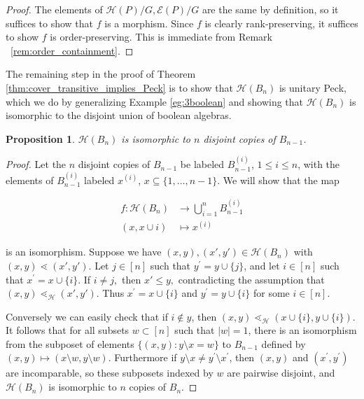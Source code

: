 \documentclass[10 pt]{amsart}
\theoremstyle{plain}
\newtheorem{prop}[thm]{Proposition}
\theoremstyle{definition}
\theoremstyle{remark}
\numberwithin{equation}{section}
\begin{document}
\begin{proof}
The elements of $\mathcal H(P)/G,\mathcal E(P)/G$ are the same by definition, so it suffices to show that $f$ is a morphism. Since $f$ is clearly rank-preserving, it suffices to show $f$ is order-preserving. This is immediate from Remark ~\ref{rem:order_containment}.
\end{proof}

The remaining step in the proof of Theorem \ref{thm:cover_transitive_implies_Peck} is to show that $\mathcal{H}(B_n)$ is unitary Peck, which we do by generalizing Example \ref{eg:3boolean} and showing that $\mathcal{H}(B_n)$ is isomorphic to the disjoint union of boolean algebras.

\begin{prop}\label{prop:computing_HBn}
$\mathcal{H}(B_n)$ is isomorphic to $n$ disjoint copies of $B_{n-1}$.
\end{prop}

\begin{proof}
Let the $n$ disjoint copies of $B_{n-1}$ be labeled $B_{n-1}^{(i)}$, $1\le i\le n$, with the elements of $B_{n-1}^{(i)}$ labeled $x^{(i)}$, $x\subseteq \{1,\ldots,n-1\}$.  We will show that the map 

\begin{align*}
f\colon \mathcal{H}(B_n) &\longrightarrow \bigcup_{i=1}^n B_{n-1}^{(i)}\\
(x,x\cup{i})&\longmapsto x^{(i)}
\end{align*}

\noindent is an isomorphism.  Suppose we have $(x, y),(x', y') \in \mathcal H(B_n)$ with $(x, y) \lessdot (x', y').$ Let $j\in [n]$ such that $y^\prime = y\cup\{j\}$, and let $i\in [n]$ such that $x^\prime = x\cup \{i\}$. If $i \ne j,$ then $x' \leq y,$ contradicting the assumption that $(x, y) \lessdot_{\mathcal H} (x', y').$ Thus $x^\prime = x\cup\{i\}$ and $y^\prime = y\cup\{i\}$ for some $i\in [n]$.

Conversely we can easily check that if $i\not\in y$, then $(x, y)\lessdot_{\mathcal{H}} (x\cup\{i\}, y\cup\{i\})$.  It follows that for all subsets $w \subset [n]$ such that $|w| = 1$, there is an isomorphism from the subposet of elements $\{(x, y)\colon y\setminus x = w\}$ to $B_{n-1}$ defined by $(x,y)\mapsto (x\setminus w,y\setminus w)$.  Furthermore if $y\setminus x \ne y^\prime \setminus x^\prime$, then $(x, y)$ and $(x^\prime, y^\prime)$ are incomparable, so these subposets indexed by $w$ are pairwise disjoint, and $\mathcal H(B_n)$ is isomorphic to $n$ copies of $B_{n}$.
\end{proof}
\end{document}
